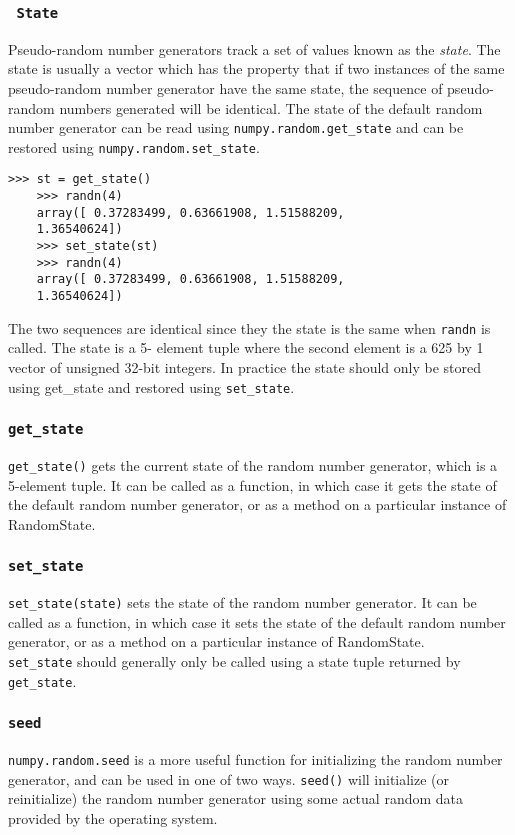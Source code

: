 \documentclass[Pydata.tex]{subfiles}
\begin{document}
\subsubsection{\texttt{ State}}
Pseudo-random number generators track a set of values known as the \textit{state}. The state is usually a vector
which has the property that if two instances of the same pseudo-random number generator have the
same state, the sequence of pseudo-random numbers generated will be identical. The state of the default
random number generator can be read using \texttt{numpy.random.get\_state} and can be restored using
\texttt{numpy.random.set\_state}.
\begin{framed}
	\begin{verbatim}>>> st = get_state()
	>>> randn(4)
	array([ 0.37283499, 0.63661908, 1.51588209,
	1.36540624])
	>>> set_state(st)
	>>> randn(4)
	array([ 0.37283499, 0.63661908, 1.51588209,
	1.36540624])
	\end{verbatim}
\end{framed}
The two sequences are identical since they the state is the same when \texttt{randn} is called. The state is a 5-
element tuple where the second element is a 625 by 1 vector of unsigned 32-bit integers. In practice the
state should only be stored using get\_state and restored using \texttt{set\_state}.
\newpage

\subsubsection{\texttt{get\_state}}
\texttt{get\_state()} gets the current state of the random number generator, which is a 5-element tuple. It can be
called as a function, in which case it gets the state of the default random number generator, or as a method
on a particular instance of RandomState.
\subsubsection*{\texttt{set\_state}}
\texttt{set\_state(state)} sets the state of the random number generator. It can be called as a function, in which
case it sets the state of the default random number generator, or as a method on a particular instance of
RandomState.\\ \texttt{set\_state} should generally only be called using a state tuple returned by \texttt{get\_state}.

\subsubsection*{\texttt{seed}}
\texttt{numpy.random.seed} is a more useful function for initializing the random number generator, and can be
used in one of two ways. \texttt{seed()} will initialize (or reinitialize) the random number generator using some
actual random data provided by the operating system.
\end{document}
